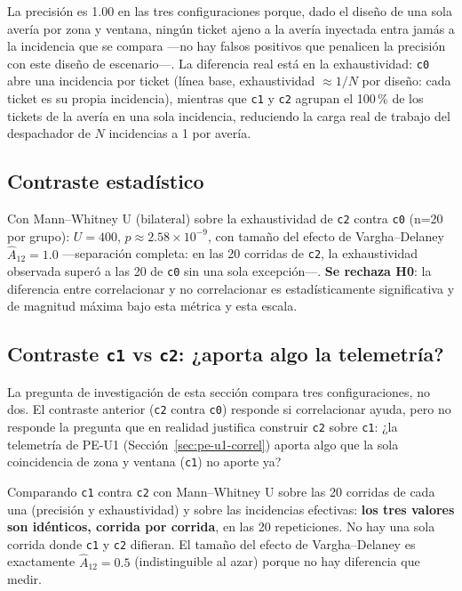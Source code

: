 La precisión es 1.00 en las tres configuraciones porque, dado el diseño de una sola avería por
zona y ventana, ningún ticket ajeno a la avería inyectada entra jamás a la incidencia que se
compara —no hay falsos positivos que penalicen la precisión con este diseño de escenario—. La
diferencia real está en la exhaustividad: \texttt{c0} abre una incidencia por ticket (línea
base, exhaustividad $\approx 1/N$ por diseño: cada ticket es su propia incidencia), mientras que
\texttt{c1} y \texttt{c2} agrupan el 100\,\% de los tickets de la avería en una sola incidencia,
reduciendo la carga real de trabajo del despachador de $N$ incidencias a 1 por avería.

\subsection{Contraste estadístico}

Con Mann--Whitney U (bilateral) sobre la exhaustividad de \texttt{c2} contra \texttt{c0}
(n=20 por grupo): $U=400$, $p \approx 2.58 \times 10^{-9}$, con tamaño del efecto de
Vargha--Delaney $\hat{A}_{12}=1.0$ —separación completa: en las 20 corridas de \texttt{c2}, la
exhaustividad observada superó a las 20 de \texttt{c0} sin una sola excepción—. \textbf{Se
rechaza H0}: la diferencia entre correlacionar y no correlacionar es estadísticamente
significativa y de magnitud máxima bajo esta métrica y esta escala.

\subsection{Contraste \texttt{c1} vs \texttt{c2}: ¿aporta algo la telemetría?}
\label{sec:contraste-c1-c2}

La pregunta de investigación de esta sección compara tres configuraciones, no dos. El contraste
anterior (\texttt{c2} contra \texttt{c0}) responde si correlacionar ayuda, pero no responde la
pregunta que en realidad justifica construir \texttt{c2} sobre \texttt{c1}: ¿la telemetría de
PE-U1 (Sección~\ref{sec:pe-u1-correl}) aporta algo que la sola coincidencia de zona y ventana
(\texttt{c1}) no aporte ya?

Comparando \texttt{c1} contra \texttt{c2} con Mann--Whitney U sobre las 20 corridas de cada una
(precisión y exhaustividad) y sobre las incidencias efectivas: \textbf{los tres valores son
idénticos, corrida por corrida}, en las 20 repeticiones. No hay una sola corrida donde
\texttt{c1} y \texttt{c2} difieran. El tamaño del efecto de Vargha--Delaney es exactamente
$\hat{A}_{12}=0.5$ (indistinguible al azar) porque no hay diferencia que medir.

